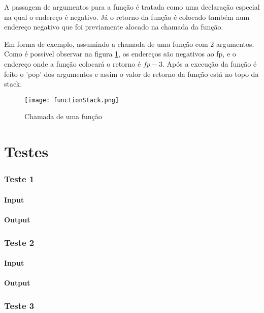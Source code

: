 \documentclass[a4paper,10pt]{report}
\begin{document}
A passagem de argumentos para a função é tratada como uma declaração especial na qual o endereço é negativo. Já o retorno da função é colocado também num endereço negativo que foi previamente alocado na chamada da função.

Em forma de exemplo, assumindo a chamada de uma função com 2 argumentos. Como é possível observar na figura \ref{fig:functionStack}, os endereços são negativos ao fp, e o endereço onde a função colocará o retorno é $fp - 3$.
Após a execução da função é feito o 'pop' dos argumentos e assim o valor de retorno da função está no topo da stack. 

\begin{figure}
\centering
\texttt{[image: functionStack.png]}
\caption{Chamada de uma função}
\label{fig:functionStack}
\end{figure}

\chapter{Testes}
\subsection{Teste 1}
\subsubsection{Input}

\subsubsection{Output}



\subsection{Teste 2}
\subsubsection{Input}

\subsubsection{Output}




\subsection{Teste 3}
\end{document}
